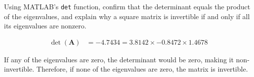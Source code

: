 Using MATLAB’s \texttt{det} function, confirm that the determinant equals the product of the eigenvalues, and explain why a square matrix is invertible if and only if all its eigenvalues are nonzero.

\begin{solution}
    \begin{align*}
        \det(\boldsymbol{A}) &= -4.7434 = 3.8142 \times -0.8472 \times 1.4678
    \end{align*}

    If any of the eigenvalues are zero, the determinant would be zero, making it non-invertible. Therefore, if none of the eigenvalues are zero, the matrix is invertible.
\end{solution}